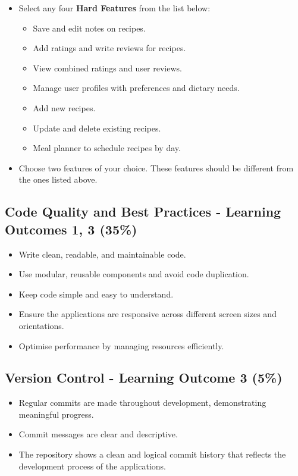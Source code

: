 \documentclass{article}
\begin{document}
\begin{itemize}
\begin{itemize}
    \item Select any four \textbf{Hard Features} from the list below:
    \begin{itemize}
      \item Save and edit notes on recipes.
      \item Add ratings and write reviews for recipes.
      \item View combined ratings and user reviews.
      \item Manage user profiles with preferences and dietary needs.
      \item Add new recipes.
      \item Update and delete existing recipes.
      \item Meal planner to schedule recipes by day.
    \end{itemize}

    \item Choose two features of your choice. These features should be different from the ones listed above.
  \end{itemize}

\end{itemize}

\subsection*{Code Quality and Best Practices - Learning Outcomes 1, 3 (35\%)}
\begin{itemize}
\item Write clean, readable, and maintainable code.
\item Use modular, reusable components and avoid code duplication.
\item Keep code simple and easy to understand.
\item Ensure the applications are responsive across different screen sizes and orientations.
\item Optimise performance by managing resources efficiently.
\end{itemize}

\subsection*{Version Control - Learning Outcome 3 (5\%)}
\begin{itemize}
  \item Regular commits are made throughout development, demonstrating meaningful progress.
  \item Commit messages are clear and descriptive.
  \item The repository shows a clean and logical commit history that reflects the development process of the applications.
\end{itemize} 
\end{document}

